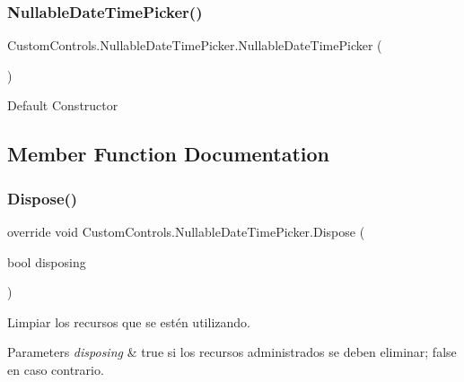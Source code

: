 \subsubsection{\texorpdfstring{Nullable\+Date\+Time\+Picker()}{NullableDateTimePicker()}}
{\footnotesize\ttfamily Custom\+Controls.\+Nullable\+Date\+Time\+Picker.\+Nullable\+Date\+Time\+Picker (\begin{DoxyParamCaption}{ }\end{DoxyParamCaption})}



Default Constructor 



\subsection{Member Function Documentation}
\mbox{\label{class_custom_controls_1_1_nullable_date_time_picker_aa8f2112f0653075b0405e3ef6ddafa0b}} 
\subsubsection{\texorpdfstring{Dispose()}{Dispose()}}
{\footnotesize\ttfamily override void Custom\+Controls.\+Nullable\+Date\+Time\+Picker.\+Dispose (\begin{DoxyParamCaption}\item[{bool}]{disposing }\end{DoxyParamCaption})\hspace{0.3cm}{\ttfamily [protected]}}



Limpiar los recursos que se estén utilizando. 


\begin{DoxyParams}{Parameters}
{\em disposing} & true si los recursos administrados se deben eliminar; false en caso contrario.\\
\hline
\end{DoxyParams}
\mbox{\label{class_custom_controls_1_1_nullable_date_time_picker_abae021db5f6f9836f2b010ce0d962076}} 
